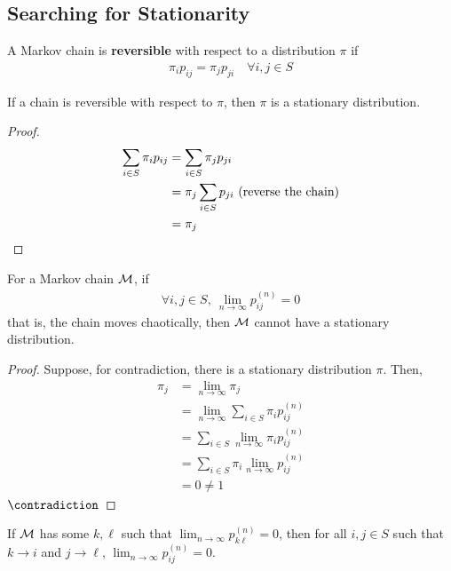 \documentclass{article}
\newcommand{\upn}[0]{^{(n)}}
\begin{document}
    \subsection{Searching for Stationarity}
    \begin{definition}
    	A Markov chain is \textbf{reversible} with respect to a distribution $\pi$ if 
	    \begin{align}
	    	\pi_i p_{ij} = \pi_j p_{ji}\quad \forall i, j \in S
	    \end{align}
	\end{definition}

	\begin{theorem}
		If a chain is reversible with respect to $\pi$, then $\pi$ is a stationary distribution.
	\end{theorem}
	
	\begin{proof}
		\begin{align}
			\sum_{i \in S} \pi_i p_{ij} &= \sum_{i \in S} \pi_j p_{ji} \\
			&= \pi_j \sum_{i \in S} p_{ji} \text{{ (reverse the chain)}}\\
			&= \pi_j
		\end{align}
	\end{proof}
	
	\begin{proposition}
		For a Markov chain $\mathcal{{M}}$, if
		\begin{align}
			\forall i, j \in S,\ \lim_{n\to\infty} p_{ij}\upn = 0
		\end{align}
		that is, the chain moves chaotically, 
		then $\mathcal{{M}}$ cannot have a stationary distribution.
	\end{proposition}
	
	\begin{proof}
		Suppose, for contradiction, there is a stationary distribution $\pi$. Then,
		\begin{align}
			\pi_j &= \lim_{n \to \infty} \pi_j \\
			&= \lim_{n \to \infty} \sum_{i \in S} \pi_i p_{ij}\upn \\
			&= \sum_{i \in S} \lim_{n \to \infty} \pi_i p_{ij}\upn \\
			&= \sum_{i \in S} \pi_i \lim_{n \to \infty} p_{ij}\upn \\
			&= 0 \neq 1
		\end{align}
		$\contradiction$
	\end{proof}
	
	\begin{lemma}
		If $\mathcal{{M}}$ has some $k, \ell$ such that $\lim_{n \to \infty} p_{k\ell}\upn = 0$, then for all $i, j \in S$
		such that $k \to i$ and $j \to \ell$,
		$\lim_{n \to \infty} p_{ij}\upn = 0$.
	\end{lemma}
	
\end{document}
